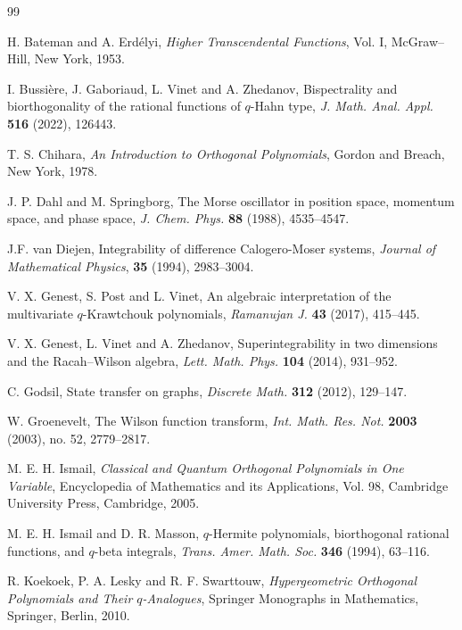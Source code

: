 \documentclass[11pt,reqno]{amsart}
\numberwithin{equation}{section}
\begin{document}
\begin{thebibliography}{99}

H. Bateman and A. Erd\'elyi,
\emph{Higher Transcendental Functions}, Vol. I,
McGraw--Hill, New York, 1953.

I. Bussi\`ere, J. Gaboriaud, L. Vinet and A. Zhedanov,
Bispectrality and biorthogonality of the rational functions of $q$-Hahn type,
\emph{J. Math. Anal. Appl.} \textbf{516} (2022), 126443.

T. S. Chihara,
\emph{An Introduction to Orthogonal Polynomials},
Gordon and Breach, New York, 1978.

J. P. Dahl and M. Springborg,
The Morse oscillator in position space, momentum space, and phase space,
\emph{J. Chem. Phys.} \textbf{88} (1988), 4535--4547.


J.F. van Diejen,
 Integrability of difference {C}alogero-{M}oser systems,
 \emph{Journal of Mathematical Physics},
\textbf{35} (1994), 2983--3004.



V. X. Genest, S. Post and L. Vinet,
An algebraic interpretation of the multivariate $q$-Krawtchouk polynomials,
\emph{Ramanujan J.} \textbf{43} (2017), 415--445.

V. X. Genest, L. Vinet and A. Zhedanov,
Superintegrability in two dimensions and the Racah--Wilson algebra,
\emph{Lett. Math. Phys.} \textbf{104} (2014), 931--952.

C. Godsil,
State transfer on graphs,
\emph{Discrete Math.} \textbf{312} (2012), 129--147.

W. Groenevelt,
The Wilson function transform,
\emph{Int. Math. Res. Not.} \textbf{2003} (2003), no. 52, 2779--2817.

M. E. H. Ismail,
\emph{Classical and Quantum Orthogonal Polynomials in One Variable},
Encyclopedia of Mathematics and its Applications, Vol. 98,
Cambridge University Press, Cambridge, 2005.

M. E. H. Ismail and D. R. Masson,
$q$-Hermite polynomials, biorthogonal rational functions, and $q$-beta integrals,
\emph{Trans. Amer. Math. Soc.} \textbf{346} (1994), 63--116.

R. Koekoek, P. A. Lesky and R. F. Swarttouw,
\emph{Hypergeometric Orthogonal Polynomials and Their $q$-Analogues},
Springer Monographs in Mathematics,
Springer, Berlin, 2010.


\end{thebibliography}
\end{document}
